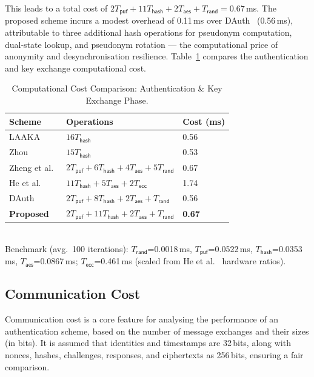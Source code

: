 \documentclass[12pt,a4paper]{report}
\begin{document}
This leads to a total cost of
$2T_{\mathsf{puf}} + 11T_{\mathsf{hash}} + 2T_{\mathsf{aes}} + T_{\mathsf{rand}}
= \mathbf{0.67}$\,ms.
The proposed scheme incurs a modest overhead of 0.11\,ms over DAuth~\cite{das2026comsnets}
(0.56\,ms), attributable to three additional hash operations for pseudonym computation,
dual-state lookup, and pseudonym rotation — the computational price of anonymity and
desynchronisation resilience.
Table~\ref{tab:comp_auth} compares the authentication and key exchange computational
cost.

\begin{table}[!ht]
  \centering
  \caption{Computational Cost Comparison: Authentication \& Key Exchange Phase.}
  \label{tab:comp_auth}
  \small
  \setlength{\tabcolsep}{5pt}
  \begin{tabular}{lll}
    \toprule
    Scheme & Operations & Cost (ms) \\
    \midrule
    LAAKA~\cite{ali2024laaka}          & $16T_\mathsf{hash}$ & 0.56 \\
    Zhou~\cite{zhou2024auth}           & $15T_\mathsf{hash}$ & 0.53 \\
    Zheng et al.~\cite{zheng2022puf}   & $2T_\mathsf{puf}+6T_\mathsf{hash}+4T_\mathsf{aes}+5T_\mathsf{rand}$ & 0.67 \\
    He et al.~\cite{he2023lightweight} & $11T_\mathsf{hash}+5T_\mathsf{aes}+2T_\mathsf{ecc}$ & 1.74 \\
    DAuth~\cite{das2026comsnets}        & $2T_\mathsf{puf}+8T_\mathsf{hash}+2T_\mathsf{aes}+T_\mathsf{rand}$ & 0.56 \\
    \textbf{Proposed}                  & $2T_\mathsf{puf}+11T_\mathsf{hash}+2T_\mathsf{aes}+T_\mathsf{rand}$ & \textbf{0.67} \\
    \bottomrule
  \end{tabular}\\[4pt]
  \small Benchmark (avg.\ 100 iterations): $T_\mathsf{rand}$=0.0018\,ms,
  $T_\mathsf{puf}$=0.0522\,ms, $T_\mathsf{hash}$=0.0353\,ms, $T_\mathsf{aes}$=0.0867\,ms;
  $T_\mathsf{ecc}$=0.461\,ms (scaled from He et al.~\cite{he2023lightweight} hardware ratios).
\end{table}

\subsection{Communication Cost}

Communication cost is a core feature for analysing the performance of an
authentication scheme, based on the number of message exchanges and their sizes (in
bits).
It is assumed that identities and timestamps are 32\,bits, along with nonces, hashes,
challenges, responses, and ciphertexts as 256\,bits, ensuring a fair comparison.
\end{document}
